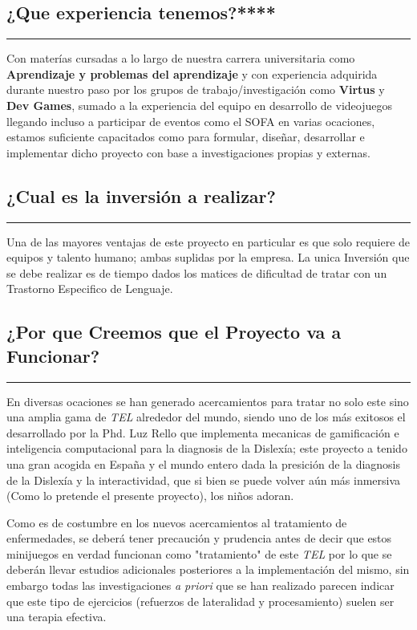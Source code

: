 \documentclass[12pt,letterpaper]{article}
\begin{document}
\subsection{¿Que experiencia tenemos?****}
\rule{150mm}{0.1mm} 
Con materías cursadas a lo largo de nuestra carrera universitaria como \textbf{Aprendizaje y problemas del aprendizaje} y con experiencia adquirida durante nuestro paso por los grupos de trabajo/investigación como \textbf{Virtus} y \textbf{Dev Games}, sumado a la experiencia del equipo en desarrollo de videojuegos llegando incluso a participar de eventos como el SOFA en varias ocaciones, estamos suficiente capacitados como para formular, diseñar, desarrollar e implementar dicho proyecto con base a investigaciones propias y externas.\\

\subsection{¿Cual es la inversión a realizar?}
\rule{150mm}{0.1mm} 
Una de las mayores ventajas de este proyecto en particular es que solo requiere de equipos y talento humano; ambas suplidas por la empresa.
La unica Inversión que se debe realizar es de tiempo dados los matices de dificultad de tratar con un Trastorno Especifico de Lenguaje.


\subsection{¿Por que Creemos que el Proyecto va a Funcionar?}
\rule{150mm}{0.1mm} 
En diversas ocaciones se han generado acercamientos para tratar no solo este sino una amplia gama de \textit{TEL} alrededor del mundo, siendo uno de los más exitosos el desarrollado por la Phd. Luz Rello que implementa mecanicas de gamificación e inteligencia computacional para la diagnosis de la Dislexía; este proyecto a tenido una gran acogida en España y el mundo entero dada la presición de la diagnosis de la Dislexía y la interactividad, que si bien se puede volver aún más inmersiva (Como lo pretende el presente proyecto), los niños adoran.

Como es de costumbre en los nuevos acercamientos al tratamiento de enfermedades, se deberá tener precaución y prudencia antes de decir que estos minijuegos en verdad funcionan como "tratamiento" de este \textit{TEL} por lo que se deberán llevar estudios adicionales posteriores a la implementación del mismo, sin embargo todas las investigaciones \textit{a priori} que se han realizado parecen indicar que este tipo de ejercicios (refuerzos de lateralidad y procesamiento) suelen ser una terapia efectiva.
\end{document}
